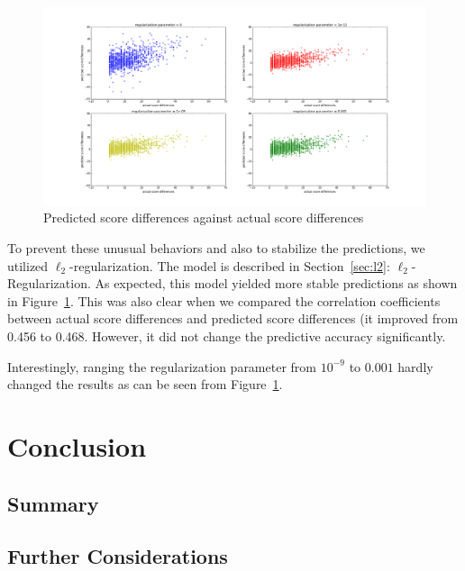 \documentclass{article} %
\begin{document}
\begin{figure}[ht!]
    \centering
    \includegraphics[width=140mm]{actual_vs_predict.png}
    \caption{Predicted score differences against actual score differences}
    \label{actual_vs_predict}
\end{figure}

To prevent these unusual behaviors and also to stabilize the predictions, we utilized $\ell_2$-regularization.  The model is described in Section~\ref{sec:l2}: $\ell_2$-Regularization.  As expected, this model yielded more stable predictions as shown in Figure~\ref{actual_vs_predict}.  This was also clear when we compared the correlation coefficients between actual score differences and predicted score differences (it improved from 0.456 to 0.468.  However, it did not change the predictive accuracy significantly.

Interestingly, ranging the regularization parameter from $10^{-9}$ to $0.001$ hardly changed the results as can be seen from Figure~\ref{actual_vs_predict}.


\section{Conclusion}
\subsection{Summary}
\subsection{Further Considerations}






\end{document}
